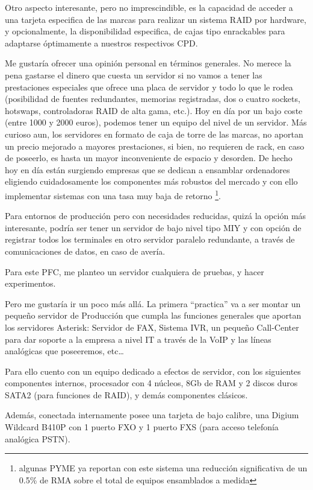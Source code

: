 Otro aspecto interesante, pero no imprescindible, es la capacidad de acceder a una tarjeta especifica de las marcas para realizar un sistema RAID por hardware, y opcionalmente, la disponibilidad especifica, de cajas tipo enrackables para adaptarse óptimamente a nuestros respectivos CPD.

Me gustaría ofrecer una opinión personal en términos generales. No merece la pena gastarse el dinero que cuesta un servidor si no vamos a tener las prestaciones especiales que ofrece una placa de servidor y todo lo que le rodea (posibilidad de fuentes redundantes, memorias registradas, dos o cuatro sockets, hotswaps, controladoras RAID de alta gama, etc.). Hoy en día por un bajo coste (entre 1000 y 2000 euros), podemos tener un equipo del nivel de un servidor. Más curioso aun, los servidores en formato de caja de torre de las marcas, no aportan un precio mejorado a mayores prestaciones, si bien, no requieren de rack, en caso de poseerlo, es hasta un mayor inconveniente de espacio y desorden. De hecho hoy en día están surgiendo empresas que se dedican a ensamblar ordenadores eligiendo cuidadosamente los componentes más robustos del mercado y con ello implementar sistemas con una tasa muy baja de retorno \footnote{algunas PYME ya reportan con este sistema una reducción significativa de un 0.5\% de RMA sobre el total de equipos ensamblados a medida}.

Para entornos de producción pero con necesidades reducidas, quizá la opción más interesante, podría ser  tener un servidor de bajo nivel tipo MIY y con opción de registrar todos los terminales en otro servidor paralelo redundante, a través de comunicaciones de datos, en caso de avería.

Para este PFC, me planteo un servidor cualquiera de pruebas, y hacer experimentos.

Pero me gustaría ir un poco más allá. La primera “practica” va a ser montar un pequeño servidor de Producción que cumpla las funciones generales que aportan los servidores Asterisk: Servidor de FAX, Sistema IVR, un pequeño Call-Center para dar soporte a la empresa a nivel IT a través de la VoIP y las líneas analógicas que poseeremos, etc…

Para ello cuento con un equipo dedicado a efectos de servidor, con los siguientes componentes internos, procesador con 4 núcleos, 8Gb de RAM y 2 discos duros SATA2 (para funciones de RAID), y demás componentes clásicos.

Además, conectada internamente posee una tarjeta de bajo calibre, una Digium Wildcard B410P con 1 puerto FXO y 1 puerto FXS (para acceso telefonía analógica PSTN).

